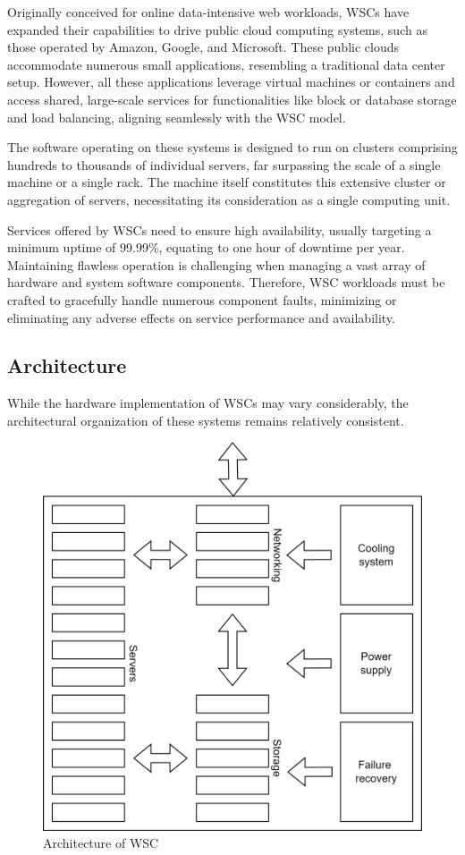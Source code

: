 Originally conceived for online data-intensive web workloads, WSCs have expanded their capabilities to drive public cloud computing systems, such as those operated by Amazon, Google, and Microsoft. 
These public clouds accommodate numerous small applications, resembling a traditional data center setup. 
However, all these applications leverage virtual machines or containers and access shared, large-scale services for functionalities like block or database storage and load balancing, aligning seamlessly with the WSC model.

The software operating on these systems is designed to run on clusters comprising hundreds to thousands of individual servers, far surpassing the scale of a single machine or a single rack. 
The machine itself constitutes this extensive cluster or aggregation of servers, necessitating its consideration as a single computing unit.

Services offered by WSCs need to ensure high availability, usually targeting a minimum uptime of 99.99\%, equating to one hour of downtime per year. 
Maintaining flawless operation is challenging when managing a vast array of hardware and system software components. 
Therefore, WSC workloads must be crafted to gracefully handle numerous component faults, minimizing or eliminating any adverse effects on service performance and availability.

\subsection{Architecture}
While the hardware implementation of WSCs may vary considerably, the architectural organization of these systems remains relatively consistent.
\begin{figure}[H]
    \centering
    \includegraphics[width=0.5\linewidth]{images/infr.png}
    \caption{Architecture of WSC}
\end{figure}

